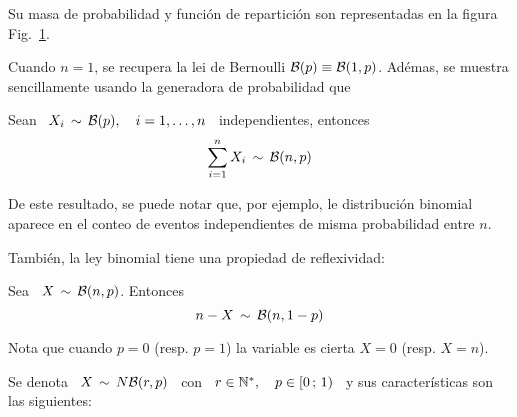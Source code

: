 Su masa  de probabilidad  y funci\'on de  repartici\'on son representadas  en la
figura Fig.~\ref{Fig:MP:Binomial}.
%
\begin{figure}[h!]
\begin{center}  \end{center}
%
\label{Fig:MP:Binomial}
\end{figure}

Cuando  $n  = 1$,  se  recupera  la lei  de  Bernoulli  $\mathcal{B}(p) \equiv  \mathcal{B}(1,p)$.
Ad\'emas, se muestra  sencillamente usando la generadora de  probabilidad que
%
\begin{lema}
\label{Lem:BinomilaSumaBernoulli}
%
  Sean \  $X_i \,  \sim \, \mathcal{B}(p),  \quad i  = 1, \ldots  , n$  \ independientes,
  entonces
  \[
  \sum_{i=1}^n X_i \, \sim \, \mathcal{B}(n,p)
  \]
\end{lema}
%
De este resultado,  se puede notar que, por  ejemplo, le distribuci\'on binomial
aparece en el conteo de eventos independientes de misma probabilidad entre $n$.

Tambi\'en, la ley binomial tiene una propiedad de reflexividad:
%
\begin{lema}[Reflexividad]
\label{Lem:MP:ReflexividadBinomial}
%
  Sea \ $X \, \sim \, \mathcal{B}(n,p)$. Entonces
  \[
  n-X \, \sim \, \mathcal{B}(n,1-p)
  \]
\end{lema}

Nota que cuando $p = 0$ (resp. $p = 1$) la variable es cierta $X = 0$ (resp.  $X
= n$).



\label{Sssec:MP:BinomialNegativa}

Se denota \ $X \, \sim \, N\mathcal{B}(r,p)$ \  con \ $r \in \mathbb{N}^*, \quad p \in [0 \, ; \, 1)$ \ y sus caracter\'isticas son las siguientes:


